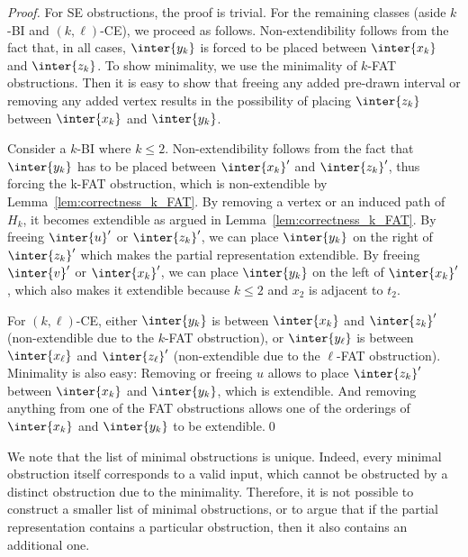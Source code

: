 \begin{proof}
For SE obstructions, the proof is trivial. For the remaining classes (aside $k$-BI and
$(k,\ell)$-CE), we proceed as follows. Non-extendibility follows from the fact that, in all cases,
$\inter{y_k}$ is forced to be placed between $\inter{x_k}$ and $\inter{z_k}$. To show minimality, we
use the minimality of $k$-FAT obstructions. Then it is easy to show that freeing any added pre-drawn
interval or removing any added vertex results in the possibility of placing $\inter{z_k}$ between
$\inter{x_k}$ and $\inter{y_k}$.

Consider a $k$-BI where $k \le 2$.  Non-extendibility follows from the fact that $\inter{y_k}$ has
to be placed between $\inter{x_k}'$ and $\inter{z_k}'$, thus forcing the k-FAT obstruction,
which is non-extendible by Lemma~\ref{lem:correctness_k_FAT}.  By removing a vertex or an induced
path of $H_k$, it becomes extendible as argued in Lemma~\ref{lem:correctness_k_FAT}. By freeing
$\inter{u}'$ or $\inter{z_k}'$, we can place $\inter{y_k}$ on the right of $\inter{z_k}'$ which
makes the partial representation extendible. By freeing $\inter{v}'$ or $\inter{x_k}'$, we can place $\inter{y_k}$ on the
left of $\inter{x_k}'$, which also makes it extendible because $k \le 2$ and $x_2$ is adjacent to
$t_2$.

For $(k,\ell)$-CE, either $\inter{y_k}$ is between $\inter{x_k}$ and $\inter{z_k}'$ (non-extendible
due to the $k$-FAT obstruction), or $\inter{y_\ell}$ is between $\inter{x_\ell}$ and
$\inter{z_\ell}'$ (non-extendible due to the $\ell$-FAT obstruction). Minimality is also easy:
Removing or freeing $u$ allows to place $\inter{z_k}'$ between $\inter{x_k}$ and $\inter{y_k}$,
which is extendible. And removing anything from one of the FAT obstructions allows one of the
orderings of $\inter{x_k}$ and $\inter{y_k}$ to be extendible.\qed
\end{proof}

We note that the list of minimal obstructions is unique. Indeed, every minimal obstruction itself
corresponds to a valid input, which cannot be obstructed by a distinct obstruction due to the
minimality. Therefore, it is not possible to construct a smaller list of minimal obstructions, or to
argue that if the partial representation contains a particular obstruction, then it also contains an
additional one.

